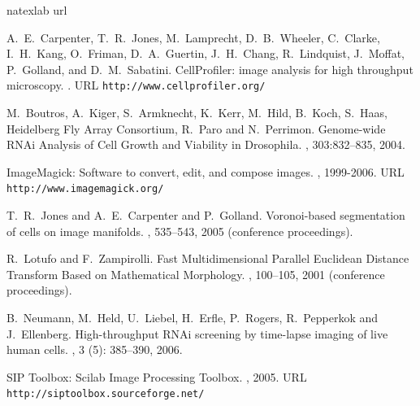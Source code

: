 \begin{thebibliography}{1}
\expandafter\ifx\csname natexlab\endcsname\relax\def\natexlab#1{#1}\fi
\expandafter\ifx\csname url\endcsname\relax
  \def\url#1{{\tt #1}}\fi

    A.~E.~Carpenter, T.~R.~Jones, M.~Lamprecht, D.~B.~Wheeler, C.~Clarke, I.~H.~Kang, O.~Friman, D.~A.~Guertin, J.~H.~Chang, R.~Lindquist, J.~Moffat, P.~Golland, and D.~M.~Sabatini.
    \newblock CellProfiler: image analysis for high throughput microscopy.
    .
    \newblock URL \url{http://www.cellprofiler.org/}


    M.~Boutros, A.~Kiger, S.~Armknecht, K.~Kerr, M.~Hild, B.~Koch, S.~Haas, Heidelberg Fly Array Consortium, R.~Paro and N.~Perrimon.
    \newblock Genome-wide RNAi Analysis of Cell Growth and Viability in Drosophila.
    , 303:832--835, 2004.

    ImageMagick: Software to convert, edit, and compose images.
    , 1999-2006.
    \newblock URL \url{http://www.imagemagick.org/}

    T.~R.~Jones and A.~E.~Carpenter and P.~Golland.
    \newblock Voronoi-based segmentation of cells on image manifolds.
    , 535--543, 2005 (conference proceedings).

    R.~Lotufo and F.~Zampirolli.
    \newblock Fast Multidimensional Parallel Euclidean Distance Transform Based on Mathematical Morphology.
    , 100--105, 2001 (conference proceedings).

    B.~Neumann, M.~Held, U.~Liebel, H.~Erfle, P.~Rogers, R.~Pepperkok and J.~Ellenberg.
    \newblock High-throughput RNAi screening by time-lapse imaging of live human cells.
    , 3 (5): 385--390, 2006.

    SIP Toolbox: Scilab Image Processing Toolbox.
    , 2005.
    \newblock URL \url{http://siptoolbox.sourceforge.net/}

\end{thebibliography}

\address{Oleg Sklyar and Wolfgang Huber\\
European Bioinformatics Institute (EMBL)\\
Wellcome Trust Genome Campus\\
Hinxton, Cambirdge\\
CB10 1SD\\
United Kingdom}


